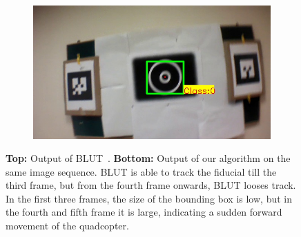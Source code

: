 \documentclass[10pt,twocolumn,letterpaper]{article}
\begin{document}
\begin{figure}
\begin{subfigure}[b]{.19\textwidth}
\end{subfigure}
\begin{subfigure}[b]{.19\textwidth}
\includegraphics[width=\linewidth]{images/BLUT_input_00/output6.jpg}
\end{subfigure}
\caption{\textbf{Top:} Output of BLUT~\cite{Wu:2011}. \textbf{Bottom:}
  Output of our algorithm on the same image 
  sequence. BLUT is able to track the fiducial till the third frame,
  but from the fourth frame onwards, BLUT looses track. In the first
  three frames, the size of the  bounding box is low, but in the fourth
  and fifth frame it is large, indicating a sudden forward movement
  of the quadcopter.} 
\label{fig:BLUT_compare_00}
\end{figure}
\end{document}

